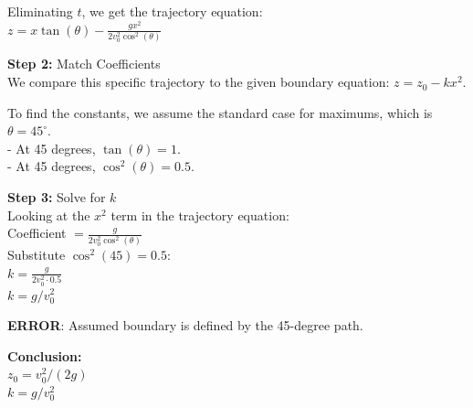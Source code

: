 \begin{minipage}{\linewidth}
\begin{tcolorbox}[
    title={IPhO 2012 Q1},
    colback=white,
    colframe=gray!50!black,
    arc=3pt,
    boxrule=1pt,
    fonttitle=\sffamily\large,
    width=\linewidth
]
\begin{minipage}[t]{0.49\linewidth}
\begin{tcolorbox}
            Eliminating $t$, we get the trajectory equation:\\
            $z = x \tan(\theta) - \frac{g x^2}{2 v_0^2 \cos^2(\theta)}$
            \vspace{1em}
            
            \textbf{\textcolor{blue!60!black}{Step 2:}} Match Coefficients\\
            We compare this specific trajectory to the given boundary equation: $z = z_0 - k x^2$.
            \vspace{0.5em}
            
            To find the constants, we assume the standard case for maximums, which is $\theta = 45^\circ$.\\
            - At 45 degrees, $\tan(\theta) = 1$.\\
            - At 45 degrees, $\cos^2(\theta) = 0.5$.
            \vspace{1em}
            
            \textbf{\textcolor{blue!60!black}{Step 3:}} Solve for $k$\\
            Looking at the $x^2$ term in the trajectory equation:\\
            Coefficient $= \frac{g}{2 v_0^2 \cos^2(\theta)}$\\
            Substitute $\cos^2(45) = 0.5$:\\
            $k = \frac{g}{2 v_0^2 \cdot 0.5}$\\
            $k = g / v_0^2$
            
            \vspace{0.3em}
            \colorbox{red!15}{\parbox{\linewidth}{\textcolor{red!80!black}{\textbf{ERROR}: Assumed boundary is defined by the 45-degree path.}}}
            \vspace{0.3em}
            
            \textbf{Conclusion:}\\
            $z_0 = v_0^2 / (2g)$\\
            $k = g / v_0^2$
            \vspace{1em}
            

\end{tcolorbox}
\end{minipage}
\end{tcolorbox}
\end{minipage}
